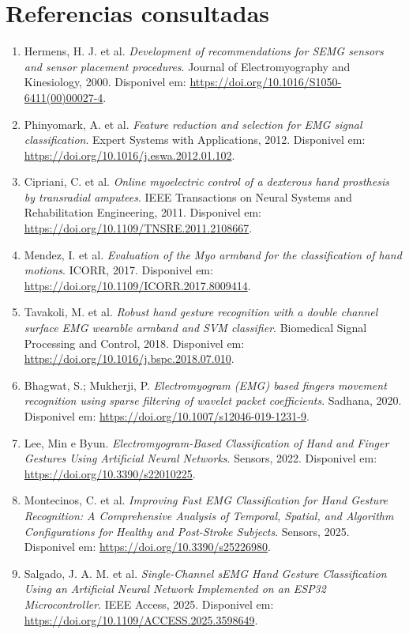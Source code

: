 \documentclass[12pt,oneside,a4paper,english,brazilian]{abntex2}
\begin{document}
\section{Referencias consultadas}

\begin{enumerate}
  \item Hermens, H. J. et al. \textit{Development of recommendations for SEMG sensors and sensor placement procedures}. Journal of Electromyography and Kinesiology, 2000. Disponivel em: \url{https://doi.org/10.1016/S1050-6411(00)00027-4}.
  \item Phinyomark, A. et al. \textit{Feature reduction and selection for EMG signal classification}. Expert Systems with Applications, 2012. Disponivel em: \url{https://doi.org/10.1016/j.eswa.2012.01.102}.
  \item Cipriani, C. et al. \textit{Online myoelectric control of a dexterous hand prosthesis by transradial amputees}. IEEE Transactions on Neural Systems and Rehabilitation Engineering, 2011. Disponivel em: \url{https://doi.org/10.1109/TNSRE.2011.2108667}.
  \item Mendez, I. et al. \textit{Evaluation of the Myo armband for the classification of hand motions}. ICORR, 2017. Disponivel em: \url{https://doi.org/10.1109/ICORR.2017.8009414}.
  \item Tavakoli, M. et al. \textit{Robust hand gesture recognition with a double channel surface EMG wearable armband and SVM classifier}. Biomedical Signal Processing and Control, 2018. Disponivel em: \url{https://doi.org/10.1016/j.bspc.2018.07.010}.
  \item Bhagwat, S.; Mukherji, P. \textit{Electromyogram (EMG) based fingers movement recognition using sparse filtering of wavelet packet coefficients}. Sadhana, 2020. Disponivel em: \url{https://doi.org/10.1007/s12046-019-1231-9}.
  \item Lee, Min e Byun. \textit{Electromyogram-Based Classification of Hand and Finger Gestures Using Artificial Neural Networks}. Sensors, 2022. Disponivel em: \url{https://doi.org/10.3390/s22010225}.
  \item Montecinos, C. et al. \textit{Improving Fast EMG Classification for Hand Gesture Recognition: A Comprehensive Analysis of Temporal, Spatial, and Algorithm Configurations for Healthy and Post-Stroke Subjects}. Sensors, 2025. Disponivel em: \url{https://doi.org/10.3390/s25226980}.
  \item Salgado, J. A. M. et al. \textit{Single-Channel sEMG Hand Gesture Classification Using an Artificial Neural Network Implemented on an ESP32 Microcontroller}. IEEE Access, 2025. Disponivel em: \url{https://doi.org/10.1109/ACCESS.2025.3598649}.

\end{enumerate}
\end{document}
